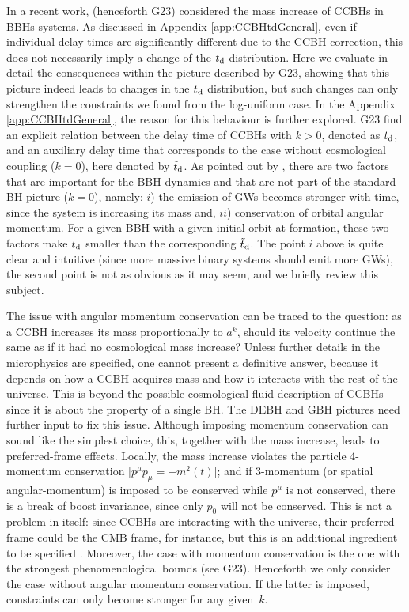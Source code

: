 \documentclass[fleqn,usenatbib,useAMS]{mnras}
\begin{document}
In a recent work, \citet{Ghodla:2023iaz} (henceforth G23) considered the mass increase of CCBHs in BBHs systems. As discussed in  Appendix \ref{app:CCBHtdGeneral}, even if individual delay times are significantly different due to the CCBH correction, this does not necessarily imply a change of the $t_{\rm d}$ distribution. Here we evaluate in detail the consequences within the picture described by G23, showing that this picture indeed leads to changes in the $t_{\rm d}$ distribution, but such changes can only strengthen the constraints we found from the log-uniform case. In the Appendix \ref{app:CCBHtdGeneral}, the reason for this behaviour is further explored. G23 find an explicit relation between the delay time of CCBHs with $k>0$, denoted as $t_{\rm d}$, and an auxiliary delay time that corresponds to the case without cosmological coupling ($k=0$), here denoted by $\tilde t_{\rm d}$. As  pointed out by  \citet{Croker:2019mup, Croker:2021duf}, there are two  factors that are important for the BBH dynamics and that are not part of the standard BH picture ($k=0$), namely: $i$) the emission of GWs becomes stronger with time,  since the system is increasing its mass and, $ii$) conservation of orbital angular momentum. For a given BBH with a given initial orbit at formation, these two factors make $t_{\rm d}$ smaller than the corresponding $\tilde t_{\rm d}$. The point $i$ above is quite clear and intuitive (since more massive binary systems should emit more GWs), the second point is not as obvious as it may seem, and we briefly review this subject. 

The issue with angular momentum conservation can be traced to the question: as a CCBH increases its mass proportionally to $a^k$, should its velocity continue the same as if it had no cosmological mass increase? Unless further details in the microphysics are specified, one cannot present a definitive answer, because it depends on how a CCBH acquires  mass and how it  interacts with the rest of the universe. This is beyond the possible cosmological-fluid description of CCBHs since it is about the property of a single BH. The DEBH and GBH pictures need further input to fix this issue. Although imposing momentum conservation can sound like the simplest choice, this, together with the mass increase, leads to preferred-frame effects. Locally, the mass increase violates the particle 4-momentum conservation [$p^\mu p_\mu = -m^2(t)$]; and if 3-momentum (or spatial angular-momentum) is imposed to be conserved while $p^\mu$ is not conserved, there is a break of boost invariance, since only $p_0$ will not be conserved. This is not a problem in itself: since CCBHs are interacting with the universe, their preferred frame  could be the CMB frame, for instance, but this is an additional ingredient to be specified \cite[see also,][for a related discussion on prefered frames]{Avelino:2023rac}. Moreover, the case with momentum conservation is the one with the strongest phenomenological bounds (see G23). Henceforth we only consider the case without angular momentum conservation. If the latter is imposed, constraints can only become stronger for any given~$k$.
\end{document}
